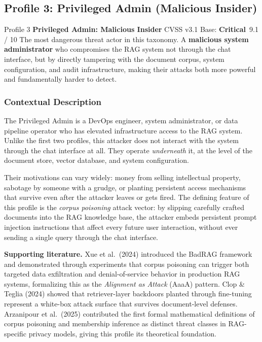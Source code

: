 \documentclass[12pt,a4paper]{report}
\newcommand{\badgecritical}{\colorbox{gray!15}{\footnotesize\textbf{Critical}}}
\begin{document}
\newpage
\subsection{Profile 3: Privileged Admin (Malicious Insider)}

\begin{profilebanner}%
  {Profile 3 \enspace\textbf{Privileged Admin: Malicious Insider}}%
  {CVSS v3.1 Base: \badgecritical\ 9.1 / 10}
  \small
  The most dangerous threat actor in this taxonomy. A \textbf{malicious
  system administrator} who compromises the RAG system not through the
  chat interface, but by directly tampering with the document corpus,
  system configuration, and audit infrastructure, making their attacks
  both more powerful and fundamentally harder to detect.
\end{profilebanner}

\subsubsection{Contextual Description}

\begin{prosebox}
The Privileged Admin is a DevOps engineer, system administrator, or data
pipeline operator who has elevated infrastructure access to the RAG system.
Unlike the first two profiles, this attacker does not interact with the
system through the chat interface at all. They operate \emph{underneath}
it, at the level of the document store, vector database, and system
configuration.

Their motivations can vary widely: money from selling intellectual property,
sabotage by someone with a grudge, or planting persistent access mechanisms
that survive even after the attacker leaves or gets fired.
The defining feature of this profile is the \emph{corpus poisoning} attack
vector: by slipping carefully crafted documents into the RAG knowledge base,
the attacker embeds persistent prompt injection instructions that affect
every future user interaction, without ever sending a single query through
the chat interface.

\medskip
\textbf{Supporting literature.}
Xue et al.\ (2024) introduced the BadRAG framework and demonstrated through
experiments that corpus poisoning can trigger both targeted data exfiltration
and denial-of-service behavior in production RAG systems, formalizing this as
the \emph{Alignment as Attack} (AaaA) pattern. Clop \& Teglia (2024)
showed that retriever-layer backdoors planted through fine-tuning represent
a white-box attack surface that survives document-level defenses.
Arzanipour et al.\ (2025) contributed the first formal mathematical
definitions of corpus poisoning and membership inference as distinct threat
classes in RAG-specific privacy models, giving this profile its theoretical
foundation.
\end{prosebox}
\end{document}
